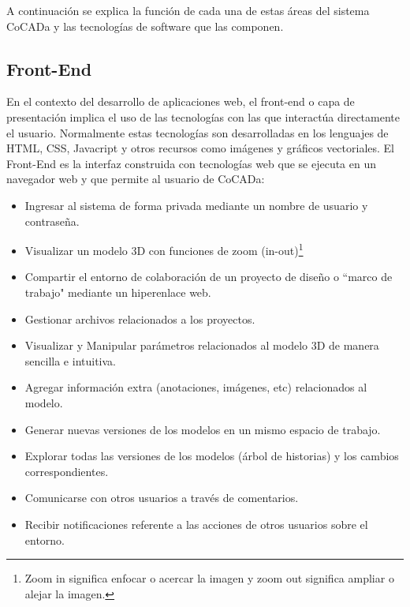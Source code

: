 \clearpage
A continuación se explica la función de cada una de estas áreas del sistema CoCADa y las tecnologías de software que las componen.
\subsection{Front-End}
En el contexto del desarrollo de aplicaciones web, el front-end o capa de presentación implica el uso de las tecnologías con las que interactúa directamente el usuario. Normalmente estas tecnologías son desarrolladas en los lenguajes de HTML, CSS, Javacript y otros recursos como imágenes y gráficos vectoriales. El Front-End es la interfaz construida con tecnologías web que se ejecuta en un navegador web y que permite al usuario de CoCADa:
\begin{itemize}
  \item Ingresar al sistema de forma privada mediante un nombre de usuario y contraseña.
  \item Visualizar un modelo 3D con funciones de zoom (in-out)\footnote{ Zoom in significa enfocar o acercar la imagen y zoom out significa ampliar o alejar la imagen.}
  \item Compartir el entorno de colaboración de un proyecto de diseño o ``marco de trabajo" mediante un hiperenlace web.
  \item Gestionar archivos relacionados a los proyectos.
  \item Visualizar y Manipular parámetros relacionados al modelo 3D de manera sencilla e intuitiva.
  \item Agregar información extra (anotaciones, imágenes, etc) relacionados al modelo.
  \item Generar nuevas versiones de los modelos en un mismo espacio de trabajo.
  \item Explorar todas las versiones de los modelos (árbol de historias) y los cambios correspondientes.
  \item Comunicarse con otros usuarios a través de comentarios.
  \item Recibir notificaciones referente a las acciones de otros usuarios sobre el entorno.
\end{itemize}

